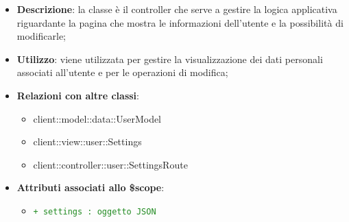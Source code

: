 			\begin{itemize}
				\item \textbf{Descrizione}: la classe è il controller che serve a gestire la logica applicativa riguardante la pagina che mostra le informazioni dell'utente e la possibilità di modificarle;
				\item \textbf{Utilizzo}: viene utilizzata per gestire la visualizzazione dei dati personali associati all'utente e per le operazioni di modifica;
				\item \textbf{Relazioni con altre classi}:
					\begin{itemize}
						\item client::model::data::UserModel
						\item client::view::user::Settings
						\item client::controller::user::SettingsRoute
					\end{itemize}

				\item \textbf{Attributi associati allo \$scope}:
					\begin{itemize}
						\item \textcolor{forestgreen}{\texttt{+ settings : oggetto JSON}}
						\end{itemize}


\end{itemize}
